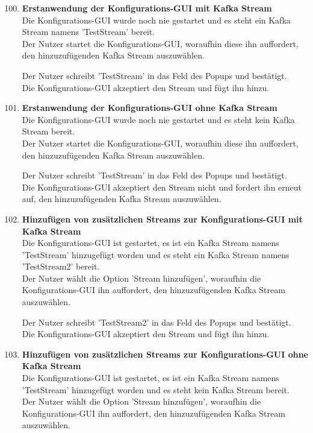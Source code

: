 \begin{enumerate}[label=\textbf{TI\arabic{enumi}0}]
	\setcounter{enumi}{99}
	
	\item \textbf{Erstanwendung der Konfigurations-GUI mit Kafka Stream}\\
		Die Konfigurations-GUI wurde noch nie gestartet und es steht ein Kafka Stream namens 'TestStream' bereit.\\
		Der Nutzer startet die Konfigurations-GUI, woraufhin diese ihn auffordert, den hinzuzufügenden Kafka Stream auszuwählen.\par
		
		Der Nutzer schreibt 'TestStream' in das Feld des Popups und bestätigt.\\
		Die Konfigurations-GUI akzeptiert den Stream und fügt ihn hinzu.
	\item \textbf{Erstanwendung der Konfigurations-GUI ohne Kafka Stream}\\
		Die Konfigurations-GUI wurde noch nie gestartet und es steht kein Kafka Stream bereit.\\
		Der Nutzer startet die Konfigurations-GUI, woraufhin diese ihn auffordert, den hinzuzufügenden Kafka Stream auszuwählen.\par
		
		Der Nutzer schreibt 'TestStream' in das Feld des Popups und bestätigt.\\
		Die Konfigurations-GUI akzeptiert den Stream nicht und fordert ihn erneut auf, den hinzuzufügenden Kafka Stream auszuwählen.
	\item \textbf{Hinzufügen von zusätzlichen Streams zur Konfigurations-GUI mit Kafka Stream}\\
		Die Konfigurations-GUI ist gestartet, es ist ein Kafka Stream namens 'TestStream' hinzugefügt worden und es steht ein Kafka Stream namens 'TestStream2' bereit.\\
		Der Nutzer wählt die Option 'Stream hinzufügen', woraufhin die Konfigurations-GUI ihn auffordert, den hinzuzufügenden Kafka Stream auszuwählen.\par
		
		Der Nutzer schreibt 'TestStream2' in das Feld des Popups und bestätigt.\\
		Die Konfigurations-GUI akzeptiert den Stream und fügt ihn hinzu.
	\item \textbf{Hinzufügen von zusätzlichen Streams zur Konfigurations-GUI ohne Kafka Stream}\\
		Die Konfigurations-GUI ist gestartet, es ist ein Kafka Stream namens 'TestStream' hinzugefügt worden und es steht kein Kafka Stream bereit.\\
		Der Nutzer wählt die Option 'Stream hinzufügen', woraufhin die Konfigurations-GUI ihn auffordert, den hinzuzufügenden Kafka Stream auszuwählen.\par
		

\end{enumerate}
